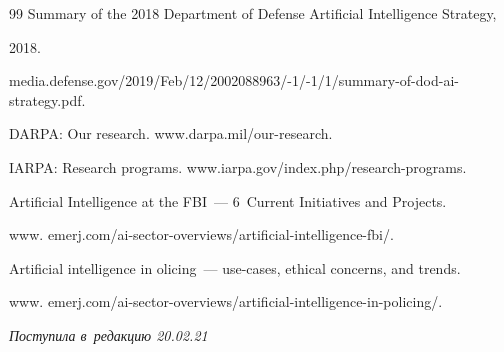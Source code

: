 {{\begin{thebibliography}{99}
Summary of the 2018 Department of Defense Artificial Intelligence Strategy,\linebreak 


2018.


     {\sf media.defense.gov/2019/Feb/12/2002088963/-1/-1/1/summary-of-dod-ai-strategy.pdf}.




DARPA: Our research. {\sf www.darpa.mil/our-research}.




IARPA: Research programs. {\sf www.iarpa.gov/index.php/research-programs}.







Artificial Intelligence at the FBI~--- 6~Current Initiatives and Projects.


{\sf www. emerj.com/ai-sector-overviews/artificial-intelligence-fbi/}.




Artificial intelligence in olicing~--- use-cases, ethical concerns, and trends.


{\sf www. emerj.com/ai-sector-overviews/artificial-intelligence-in-policing/}.


\end{thebibliography}


}}





\vspace*{-6pt}





\hfill{\small\textit{Поступила в~редакцию 20.02.21}}




























